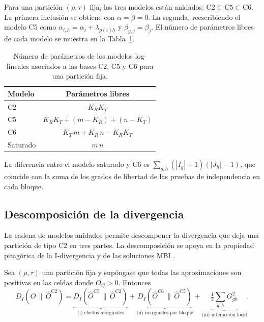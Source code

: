 Para una partición $(\rho, \tau)$ fija, los tres modelos están anidados:
$\mathrm{C2} \subset \mathrm{C5} \subset \mathrm{C6}$. La primera inclusión se
obtiene con $\alpha = \beta = 0$. La segunda, reescribiendo el modelo C5 como
$\alpha_{i,h} = \alpha_i + \lambda_{\rho(i) h}$ y $\beta_{g,j} = \beta_j$. El
número de parámetros libres de cada modelo se muestra en la
Tabla~\ref{tab:parametros}.

\begin{table}[ht]
  \centering
  {\footnotesize
  \begin{tabular}{@{}lc@{}}
    \toprule
    \textbf{Modelo} & \textbf{Parámetros libres} \\
    \midrule
    C2 & $K_R K_T$ \\
    C5 & $K_R K_T + (m - K_R) + (n - K_T)$ \\
    C6 & $K_T\, m + K_R\, n - K_R K_T$ \\
    Saturado & $m\,n$ \\
    \bottomrule
  \end{tabular}
  }
  \caption{Número de parámetros de los modelos log-lineales asociados a las bases
  C2, C5 y C6 para una partición fija.}
  \label{tab:parametros}
\end{table}

La diferencia entre el modelo saturado y C6 es
$\sum_{g,h} (|I_g| - 1)(|J_h| - 1)$, que coincide con la suma de los grados de
libertad de las pruebas de independencia en cada bloque.

\subsection{Descomposición de la divergencia}\label{sec:descomposicion}

La cadena de modelos anidados permite descomponer la divergencia que deja una
partición de tipo C2 en tres partes. La descomposición se apoya en la propiedad
pitagórica de la I-divergencia \cite{Csiszar1975} y de las soluciones MBI
\cite[Lema~3]{Banerjee2007}.

\begin{proposicion}\label{prop:descomposicion}
Sea $(\rho,\tau)$ una partición fija y supóngase que todas las aproximaciones son
positivas en las celdas donde $O_{ij} > 0$. Entonces
\begin{equation}\label{eq:descomposicion}
  D_I\!\left(O \,\|\, \hat{O}^{\mathrm{C2}}\right)
  = \underbrace{D_I\!\left(\hat{O}^{\mathrm{C5}} \,\|\, \hat{O}^{\mathrm{C2}}\right)}_{\text{(i) efectos marginales}}
  + \underbrace{D_I\!\left(\hat{O}^{\mathrm{C6}} \,\|\, \hat{O}^{\mathrm{C5}}\right)}_{\text{(ii) marginales por bloque}}
  + \underbrace{\tfrac{1}{2} \textstyle\sum_{g,h} G^2_{gh}}_{\text{(iii) interacción local}} .
\end{equation}
\end{proposicion}

